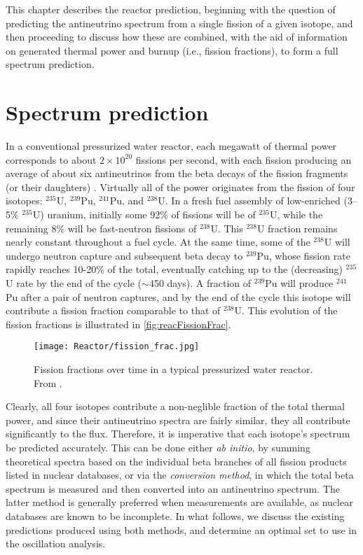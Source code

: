 \documentclass[../thesis.tex]{subfiles}
\begin{document}
This chapter describes the reactor prediction, beginning with the question of predicting the antineutrino spectrum from a single fission of a given isotope, and then proceeding to discuss how these are combined, with the aid of information on generated thermal power and burnup (i.e., fission fractions), to form a full spectrum prediction.

\section{Spectrum prediction}
\label{sec:specpred}

\def\urfive{$^{235}$U\xspace} \def\punine{$^{239}$Pu\xspace}
\def\puone{$^{241}$Pu\xspace} \def\ureight{$^{238}$U\xspace}

In a conventional pressurized water reactor, each megawatt of thermal power corresponds to about $2\times10^{20}$ fissions per second, with each fission producing an average of about six antineutrinos from the beta decays of the fission fragments (or their daughters) \cite{PhysRevC.84.024617}. Virtually all of the power originates from the fission of four isotopes: \urfive, \punine, \puone, and \ureight. In a fresh fuel assembly of low-enriched (3--5\% $^{235}$U) uranium, initially some 92\% of fissions will be of \urfive, while the remaining 8\% will be fast-neutron fissions of \ureight. This \ureight fraction remains nearly constant throughout a fuel cycle. At the same time, some of the \ureight will undergo neutron capture and subsequent beta decay to \punine, whose fission rate rapidly reaches 10-20\% of the total, eventually catching up to the (decreasing) \urfive rate by the end of the cycle ($\sim$450 days). A fraction of \punine will produce \puone after a pair of neutron captures, and by the end of the cycle this isotope will contribute a fission fraction comparable to that of \ureight. This evolution of the fission fractions is illustrated in \autoref{fig:reacFissionFrac}.

\begin{figure}[ht]
  \texttt{[image: Reactor/fission\_frac.jpg]}
  \caption{Fission fractions over time in a typical pressurized water reactor. From \cite{spectrum2017}.}
  \label{fig:reacFissionFrac}
\end{figure}

Clearly, all four isotopes contribute a non-neglible fraction of the total thermal power, and since their antineutrino spectra are fairly similar, they all contribute significantly to the flux. Therefore, it is imperative that each isotope's spectrum be predicted accurately. This can be done either \emph{ab initio}, by summing theoretical spectra based on the individual beta branches of all fission products listed in nuclear databases, or via the \emph{conversion method}, in which the total beta spectrum is measured and then converted into an antineutrino spectrum. The latter method is generally preferred when measurements are available, as nuclear databases are known to be incomplete. In what follows, we discuss the existing predictions produced using both methods, and determine an optimal set to use in the oscillation analysis.
\end{document}

